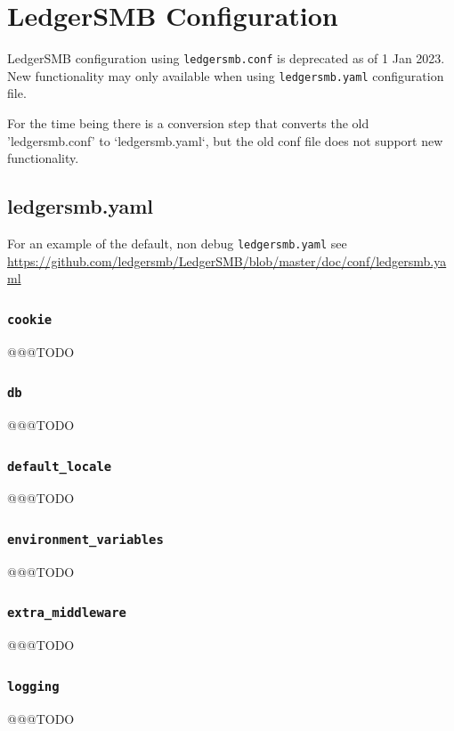 \section{LedgerSMB Configuration}
\label{sec-global-config-ledgersmb}

LedgerSMB configuration using \texttt{ledgersmb.conf}  is deprecated as of 1 Jan 2023. New functionality may only available when using \texttt{ledgersmb.yaml}  configuration file.

For the time being there is a conversion step that converts the old 'ledgersmb.conf' to `ledgersmb.yaml`, but the old conf file does not support new functionality.

\subsection{ledgersmb.yaml}
\label{subsec-global-config-ledgersmb-yaml}

For an example of the default, non debug \texttt{ledgersmb.yaml}  see  \url{https://github.com/ledgersmb/LedgerSMB/blob/master/doc/conf/ledgersmb.yaml}

\subsubsection{\texttt{cookie}}
 @@@TODO

\subsubsection{\texttt{db}}
 @@@TODO

\subsubsection{\texttt{default\_locale}}
@@@TODO

\subsubsection{\texttt{environment\_variables}}
 @@@TODO

\subsubsection{\texttt{extra\_middleware}}
@@@TODO

\subsubsection{\texttt{logging}}
@@@TODO

